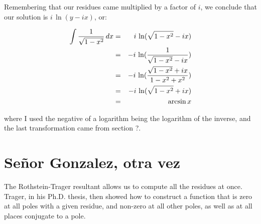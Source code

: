 Remembering that our residues came multiplied by a factor of $i$, we
conclude that our solution is $i\,\ln(y-ix)$, or:

\begin{eqnarray*}
\int {1\over{\sqrt{1-x^2}}} \,dx &=& i\,\ln(\sqrt{1-x^2}-ix) \\
                                 &=& -i\,\ln({1\over{\sqrt{1-x^2}-ix}}) \\
                                 &=& -i\,\ln({{\sqrt{1-x^2}+ix}\over{1-x^2+x^2}}) \\
                                 &=& -i\,\ln({\sqrt{1-x^2}+ix}) \\
                                 &=& \arcsin x \\
\end{eqnarray*}

where I used the negative of a logarithm being the logarithm of
the inverse, and the last transformation came from section ?.


\endexample


\section{Se\~nor Gonzalez, otra vez}

The Rothstein-Trager resultant allows us to compute all the residues
at once.  Trager, in his Ph.D. thesis, then showed how to construct a
function that is zero at all poles with a given residue, and non-zero
at all other poles, as well as at all places conjugate to a pole.
